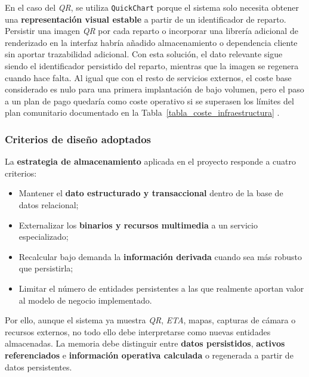 En el caso del \textit{QR}, se utiliza \texttt{QuickChart} porque el sistema solo necesita obtener una \textbf{representación visual estable} a partir de un identificador de reparto. Persistir una imagen \textit{QR} por cada reparto o incorporar una librería adicional de renderizado en la interfaz habría añadido almacenamiento o dependencia cliente sin aportar trazabilidad adicional. Con esta solución, el dato relevante sigue siendo el identificador persistido del reparto, mientras que la imagen se regenera cuando hace falta. Al igual que con el resto de servicios externos, el coste base considerado es nulo para una primera implantación de bajo volumen, pero el paso a un plan de pago quedaría como coste operativo si se superasen los límites del plan comunitario documentado en la Tabla~\ref{tabla_coste_infraestructura} \citep{quickchartqr2026,quickchartpricing2026}.

\subsubsection*{Criterios de diseño adoptados}

La \textbf{estrategia de almacenamiento} aplicada en el proyecto responde a cuatro criterios:

\begin{itemize}
    \item Mantener el \textbf{dato estructurado y transaccional} dentro de la base de datos relacional;
    \item Externalizar los \textbf{binarios y recursos multimedia} a un servicio especializado;
    \item Recalcular bajo demanda la \textbf{información derivada} cuando sea más robusto que persistirla;
    \item Limitar el número de entidades persistentes a las que realmente aportan valor al modelo de negocio implementado.
\end{itemize}

Por ello, aunque el sistema ya muestra \textit{QR}, \textit{ETA}, mapas, capturas de cámara o recursos externos, no todo ello debe interpretarse como nuevas entidades almacenadas. La memoria debe distinguir entre \textbf{datos persistidos}, \textbf{activos referenciados} e \textbf{información operativa calculada} o regenerada a partir de datos persistentes.
